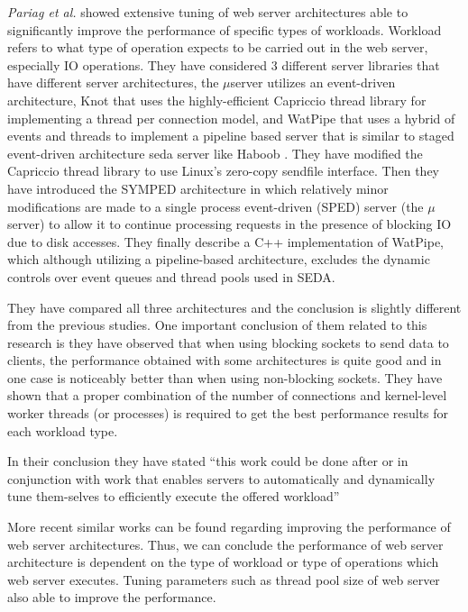 \textit{Pariag et al.} \cite{comp_ac}  showed extensive tuning of web server architectures able to significantly improve the performance of specific types of workloads. Workload refers to what type of operation expects to be carried out in the web server, especially IO operations. They have considered 3 different server libraries that have different server architectures, the $\mu$server utilizes an event-driven architecture, Knot that uses the highly-efficient Capriccio thread library for implementing a thread per connection model, and WatPipe that uses a hybrid of events and threads to implement a pipeline based server that is similar to staged event-driven architecture \acrfull{seda} server like Haboob \cite{seda}. They have modified the Capriccio thread library to use Linux's zero-copy sendfile interface. Then they have introduced the \acrfull{SYMPED} architecture in which relatively minor modifications are made to a single process event-driven (SPED) \cite{flash_server} server (the $\mu$server) to allow it to continue processing requests in the presence of blocking IO due to disk accesses. They finally describe a C++ implementation of WatPipe, which although utilizing a pipeline-based architecture, excludes the dynamic controls over event queues and thread pools used in SEDA. 

They have compared all three architectures and the conclusion is slightly different from the previous studies. One important conclusion of them related to this research is they have observed that when using blocking sockets to send data to clients, the performance obtained with some architectures is quite good and in one case is noticeably better than when using non-blocking sockets. They have shown that a proper combination of the number of connections and kernel-level worker threads (or processes) is required to get the best performance results for each workload type.

In their conclusion they have stated  “this work could be done after or in conjunction with work that enables servers to automatically and dynamically tune them-selves to efficiently execute the offered workload”

More recent similar works \cite{comparing_high_performance_multi_core,uniproc_multiproc} can be found regarding improving the performance of web server architectures. Thus, we can conclude the performance of web server architecture is dependent on the type of workload or type of operations which web server executes. Tuning parameters such as thread pool size of web server also able to improve the performance.


